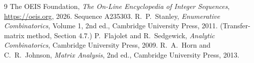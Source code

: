 \documentclass[11pt,a4paper]{article}
\theoremstyle{plain}
\theoremstyle{definition}
\begin{document}
\begin{thebibliography}{9}
 The OEIS Foundation, \emph{The On-Line Encyclopedia of Integer
Sequences}, \url{https://oeis.org}, 2026. Sequence A235303.
 R.~P.~Stanley, \emph{Enumerative Combinatorics}, Volume 1, 2nd ed.,
Cambridge University Press, 2011. (Transfer-matrix method, Section 4.7.)
 P.~Flajolet and R.~Sedgewick, \emph{Analytic Combinatorics}, Cambridge
University Press, 2009.
 R.~A.~Horn and C.~R.~Johnson, \emph{Matrix Analysis}, 2nd ed., Cambridge
University Press, 2013.
\end{thebibliography}
\end{document}

